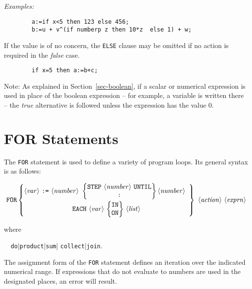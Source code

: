 \textit{Examples:}
\begin{verbatim}
        a:=if x<5 then 123 else 456;
        b:=u + v^(if numberp z then 10*z  else 1) + w;
\end{verbatim}
If the value is of no concern, the \texttt{ELSE} clause may be omitted if no
action is required in the \emph{false} case.
\begin{verbatim}
        if x=5 then a:=b+c;
\end{verbatim}
Note:  As explained in Section~\ref{sec-boolean},
if a scalar or numerical expression is used in place of
the boolean expression -- for example, a variable is written there -- the
\emph{true} alternative is followed unless the expression has the value 0.

\section{FOR Statements}
\hypertarget{command:FOR}{}
\hypertarget{command:FOREACH}{}
\hypertarget{reserved:IN}{}
\hypertarget{reserved:DO}{}
\hypertarget{reserved:SUM}{}
\hypertarget{reserved:PRODUCT}{}

The \texttt{FOR} statement
is used to define a variety of program
loops.  Its general syntax is as follows:
\begin{small}
\[ \mbox{\texttt{FOR}} \left\{ \begin{array}{@{}ccc@{}}
    \mbox{\meta{var} \texttt{:=} \meta{number} } \left\{ \begin{array}{@{}c@{}}
    \mbox{\texttt{STEP} \meta{number} \texttt{UNTIL}} \\
    \mbox{\texttt{:}}
    \end{array}
    \right\} \mbox{\meta{number}} \\[3mm]
    \multicolumn{1}{c}{\mbox{\texttt{EACH} \meta{var}
       $\left\{
          \begin{tabular}{@{}c@{}}
              \texttt{IN} \\ \texttt{ON}
          \end{tabular}
       \right\}$
       \meta{list}}}
    \end{array}
    \right\} \mbox{ \meta{action} \meta{exprn}} \]
\end{small}%
%
where
\begin{syntax}
  \ \BNFprod\ \texttt{do}|\texttt{product}|\texttt{sum}|%
                           \texttt{collect}|\texttt{join}.
\end{syntax}
The assignment form of the \texttt{FOR} statement defines an
iteration over the indicated numerical range.  If expressions that do not
evaluate to numbers are used in the designated places, an error will
result.

